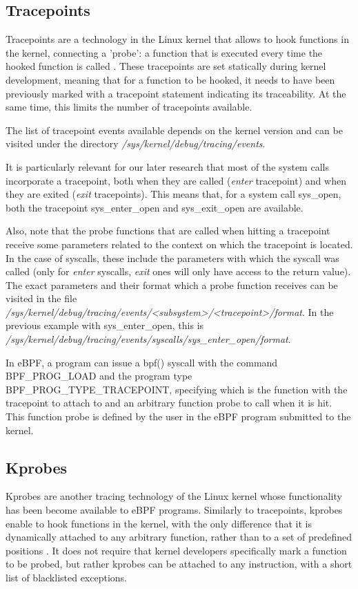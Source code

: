 \subsection{Tracepoints} \label{subsection:tracepoints}
Tracepoints are a technology in the Linux kernel that allows to hook functions in the kernel, connecting a 'probe': a function that is executed every time the hooked function is called \cite{tp_kernel}. These tracepoints are set statically during kernel development, meaning that for a function to be hooked, it needs to have been previously marked with a tracepoint statement indicating its traceability. At the same time, this limits the number of tracepoints available.

The list of tracepoint events available depends on the kernel version and can be visited under the directory \textit{/sys/kernel/debug/tracing/events}.

It is particularly relevant for our later research that most of the system calls incorporate a tracepoint, both when they are called (\textit{enter} tracepoint) and when they are exited (\textit{exit} tracepoints). This means that, for a system call sys\_open, both the tracepoint sys\_enter\_open and sys\_exit\_open are available. 

Also, note that the probe functions that are called when hitting a tracepoint receive some parameters related to the context on which the tracepoint is located. In the case of syscalls, these include the parameters with which the syscall was called (only for \textit{enter} syscalls, \textit{exit} ones will only have access to the return value). The exact parameters and their format which a probe function receives can be visited in the file \textit{/sys/kernel/debug/tracing/events/<subsystem>/<tracepoint>/format}. In the previous example with sys\_enter\_open, this is \textit{/sys/kernel/debug/tracing/events/syscalls/sys\_enter\_open/format}.

In eBPF, a program can issue a bpf() syscall with the command BPF\_PROG\_LOAD and the program type BPF\_PROG\_TYPE\_TRACEPOINT, specifying which is the function with the tracepoint to attach to and an arbitrary function probe to call when it is hit. This function probe is defined by the user in the eBPF program submitted to the kernel.

\subsection{Kprobes}
Kprobes are another tracing technology of the Linux kernel whose functionality has been become available to eBPF programs. Similarly to tracepoints, kprobes enable to hook functions in the kernel, with the only difference that it is dynamically attached to any arbitrary function, rather than to a set of predefined positions \cite{kprobe_manual}. It does not require that kernel developers specifically mark a function to be probed, but rather kprobes can be attached to any instruction, with a short list of blacklisted exceptions. 

